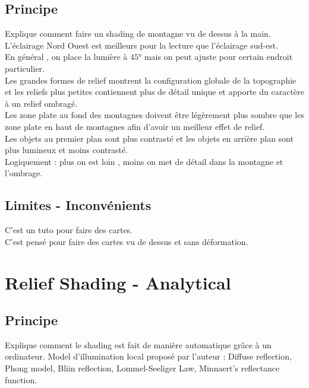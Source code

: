 \documentclass[a4paper]{article}
\begin{document}
\subsection{Principe}
Explique comment faire un shading de montagne vu de dessus à la main. 
L'éclairage Nord Ouest est meilleurs pour la lecture que l'éclairage sud-est. \\
En général , on place la lumière à $45°$ mais on peut ajuste pour certain endroit particulier. \\
Les grandes formes de relief montrent la configuration globale de la topographie et les reliefs plus petites contiennent plus de détail unique et apporte du caractère à un relief ombragé. \\
Les zone plate au fond des montagnes doivent être légèrement plus sombre que les zone plate en haut de montagnes afin d'avoir un meilleur effet de relief. \\
Les objets au premier plan sont plus contrasté et les objets en arrière plan sont plus lumineux et moins contrasté. \\
Logiquement : plus on est loin , moins on met de détail dans la montagne et l'ombrage. \\ 



\subsection{Limites - Inconvénients}
C'est un tuto pour faire des cartes.\\
C'est pensé pour faire des cartes vu de dessus et sans déformation. 


\section{Relief Shading - Analytical }
\subsection{Principe}
Explique comment le shading est fait de manière automatique grâce à un ordinateur. 
Model d'illumination local proposé par l'auteur : Diffuse reflection, Phong model, Bliin reflection, Lommel-Seeliger Law, Minnaert's reflectance function. 
\end{document}
